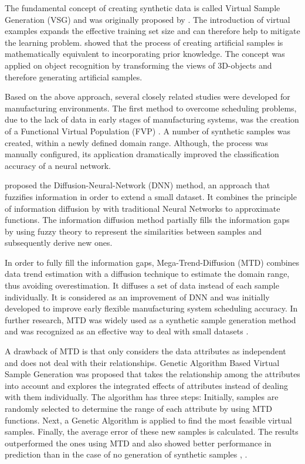 The fundamental concept of creating synthetic data is called Virtual Sample Generation (VSG) and was originally proposed by \cite{Niyogi.1998}. The introduction of virtual examples expands the effective training set size and can therefore help to mitigate the learning problem. \cite{Niyogi.1998} showed that the process of creating artificial samples is mathematically equivalent to incorporating prior knowledge. The concept was applied on object recognition by transforming the views of 3D-objects and therefore generating artificial samples.

Based on the above approach, several closely related studies were developed for manufacturing environments. The first method to overcome scheduling problems, due to the lack of data in early stages of manufacturing systems, was the creation of a Functional Virtual Population (FVP) \cite{Li.2003}. A number of synthetic samples was created, within a newly defined domain range. Although, the process was manually configured, its application dramatically improved the classification accuracy of a neural network. 

\cite{Huang.2004} proposed the Diffusion-Neural-Network (DNN) method, an approach that fuzzifies information in order to extend a small dataset. It combines the principle of information diffusion by \cite{Huang.1997} with traditional Neural Networks to approximate functions. The information diffusion method partially fills the information gaps by using fuzzy theory to represent the similarities between samples and subsequently derive new ones.

In order to fully fill the information gaps, Mega-Trend-Diffusion (MTD) \cite{Li.2007} combines data trend estimation with a diffusion technique to estimate the domain range, thus avoiding overestimation. It diffuses a set of data instead of each sample individually. It is considered as an improvement of DNN and was initially developed to improve early flexible manufacturing system scheduling accuracy. In further research, MTD was widely used as a synthetic sample generation method and was recognized as an effective way to deal with small datasets \cite{AbdulLateh.2017}.

A drawback of MTD is that only considers the data attributes as independent and does not deal with their relationships. Genetic Algorithm Based Virtual Sample Generation was proposed that takes the relationship among the attributes into account and explores the integrated effects of attributes instead of dealing with them individually. The algorithm has three steps: Initially, samples are randomly selected to determine the range of each attribute by using MTD functions. Next, a Genetic Algorithm is applied to find the most feasible virtual samples. Finally, the average error of these new samples is calculated. The results outperformed the ones using MTD and also showed better performance in prediction than in the case of no generation of synthetic samples \cite{Li.2014}, \cite{Lin.2010}.

